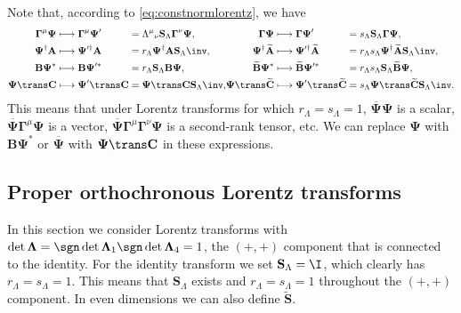 \documentclass[11pt]{article}
\newcommand{\Gammab}{\boldsymbol{\Gamma}}
\renewcommand{\S}{\mathbf{S}}
\newcommand{\A}{\mathbf{A}}
\newcommand{\B}{\mathbf{B}}
\renewcommand{\C}{\mathbf{C}}
\newcommand{\At}{\widetilde{\A}}
\newcommand{\Bt}{\widetilde{\B}}
\newcommand{\Ct}{\widetilde{\C}}
\newcommand{\St}{\widetilde{\S}}
\newcommand{\Psib}{\boldsymbol{\Psi}}
\newcommand{\Lambdab}{\boldsymbol{\Lambda}}
\begin{document}
Note that, according to \cref{eq:constnormlorentz}, we have
%
\begin{equation}\label{eq:cclorentz}
\begin{alignedat}{4}
  \Gammab^\mu \Psib &\longmapsto \Gammab^\mu \Psib' &
    &= \Lambda^\mu{}_\nu \S_\Lambda \Gammab^\nu \Psib, &
  \Gammab \Psib &\longmapsto \Gammab \Psib' &
    &= s_\Lambda \S_\Lambda \Gammab \Psib, \\ 
  \Psib^\dag \A &\longmapsto \Psib'^\dag \A &
    &= r_\Lambda \Psib^\dag \A \S_\Lambda\inv, & \qquad
  \Psib^\dag \At &\longmapsto \Psib'^\dag \At &
    &= r_\Lambda s_\Lambda \Psib^\dag \At \S_\Lambda\inv, \\ 
  \B \Psib^\ast &\longmapsto \B \Psib'^\ast &
    &= r_\Lambda \S_\Lambda \B \Psib, & 
  \Bt \Psib^\ast &\longmapsto \Bt \Psib'^\ast &
    &= r_\Lambda s_\Lambda \S_\Lambda \Bt \Psib, \\ 
  \Psib\trans \C &\longmapsto \Psib'{}\trans \C &
    &= \Psib\trans \C \S_\Lambda\inv, &
  \Psib\trans \Ct &\longmapsto \Psib'{}\trans \Ct &
    &= s_\Lambda \Psib\trans \Ct \S_\Lambda\inv. \\ 
\end{alignedat}
\end{equation}
%
This means that under Lorentz transforms for which \(r_\Lambda = s_\Lambda = 1\), 
\(\overline{\Psib} \Psib\) is a scalar,
\(\overline{\Psib} \Gammab^\mu \Psib\) is a vector,
\(\overline{\Psib} \Gammab^\mu \Gammab^\nu \Psib\) is a second-rank tensor, etc.
We can replace \(\Psib\) with \(\B \Psib^\ast\) or \(\overline{\Psib}\) with \(\Psib\trans \C\) in these expressions. 



\subsection{Proper orthochronous Lorentz transforms}\label{sec:properlorentz}

In this section we consider Lorentz transforms with \(\det \Lambdab = \sgn \det \Lambdab_1 \sgn \det \Lambdab_4 = 1\), \ie the \((+,+)\) component that is connected to the identity.
For the identity transform we set \(\S_\Lambda = \I\), which clearly has \(r_\Lambda = s_\Lambda = 1\).
This means that \(\S_\Lambda\) exists and \(r_\Lambda = s_\Lambda = 1\) throughout the \((+,+)\) component.
In even dimensions we can also define \(\St\).
\end{document}
